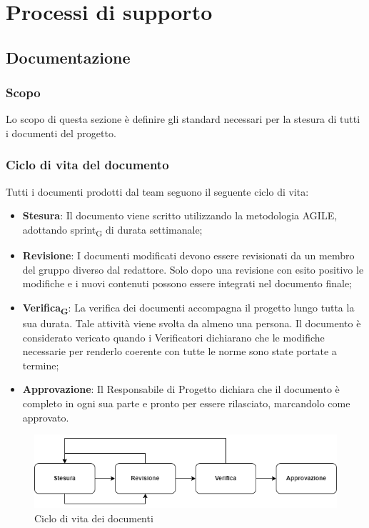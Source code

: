 \section{Processi di supporto}

\subsection{Documentazione}

\subsubsection{Scopo}
Lo scopo di questa sezione è definire gli standard necessari per la stesura di tutti i documenti del progetto.

\subsubsection{Ciclo di vita del documento}
Tutti i documenti prodotti dal team seguono il seguente ciclo di vita:
\begin{itemize}
    \item \textbf{Stesura}: Il documento viene scritto utilizzando la metodologia AGILE, adottando sprint\textsubscript{G} di durata settimanale;
    \item \textbf{Revisione}: I documenti modificati devono essere revisionati da un membro del gruppo diverso dal redattore. Solo dopo una revisione con esito positivo le modifiche e i nuovi contenuti possono essere integrati nel documento finale;
    \item \textbf{Verifica\textsubscript{G}}: La verifica dei documenti accompagna il progetto lungo tutta la sua durata. Tale attività viene svolta da almeno una persona. Il documento è considerato 
	vericato quando i Verificatori dichiarano che le modifiche necessarie per renderlo coerente con tutte le norme sono state portate a termine; 
    \item \textbf{Approvazione}: Il Responsabile di Progetto dichiara che il documento è completo in ogni sua parte e pronto per essere rilasciato, marcandolo come approvato.
\end{itemize}
\begin{figure}[H]
    \centering
    \includegraphics[scale=0.8]{img/ciclo_di_vita.png}
    \caption{Ciclo di vita dei documenti}
\end{figure}

